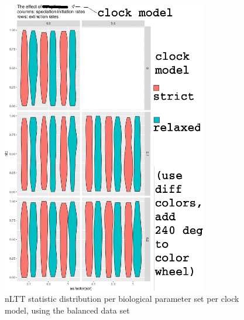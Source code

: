 \documentclass{article}
\begin{document}





\appendix

\begin{figure}[!htbp]
  \includegraphics[width=0.8\textwidth]{fig_clock_model.png}
  \caption{
    nLTT statistic distribution per biological parameter set per clock model,
    using the balanced data set 
  }
\end{figure}
\end{document}
